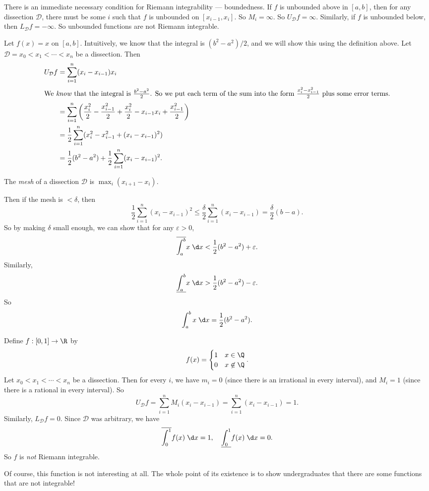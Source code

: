 \documentclass[a4paper]{article}
\begin{document}
There is an immediate necessary condition for Riemann integrability --- boundedness. If $f$ is unbounded above in $[a, b]$, then for any dissection $\mathcal{D}$, there must be some $i$ such that $f$ is unbounded on $[x_{i - 1}, x_i]$. So $M_i = \infty$. So $U_\mathcal{D} f = \infty$. Similarly, if $f$ is unbounded below, then $L_{\mathcal{D}} f = -\infty$. So unbounded functions are not Riemann integrable.

\begin{eg}
  Let $f(x) = x$ on $[a, b]$. Intuitively, we know that the integral is $(b^2 - a^2)/2$, and we will show this using the definition above. Let $\mathcal{D} = x_0 < x_1 < \cdots < x_n$ be a dissection. Then
  \begin{align*}
    U_{\mathcal{D}}f &= \sum_{i = 1}^n (x_i - x_{i - 1})x_i\\
    \intertext{We \emph{know} that the integral is $\frac{b^2 - a^2}{2}$. So we put each term of the sum into the form $\frac{x_i^2 - x_{i - 1}^2}{2}$ plus some error terms.}
    &= \sum_{i = 1}^n \left(\frac{x_i^2}{2} - \frac{x_{i - 1}^2}{2} + \frac{x_i^2}{2} - x_{i - 1}x_i + \frac{x_{i - 1}^2}{2}\right)\\
    &= \frac{1}{2}\sum_{i = 1}^n (x_i^2 - x_{i - 1}^2 + (x_i - x_{i - 1})^2)\\
    &= \frac{1}{2}(b^2 - a^2) + \frac{1}{2}\sum_{i = 1}^n(x_i - x_{i - 1})^2.
  \end{align*}
  \begin{defi}[Mesh]
    The \emph{mesh} of a dissection $\mathcal{D}$ is $\max_i (x_{i+1} - x_i)$.
  \end{defi}
  Then if the mesh is $ < \delta$, then
    \[
      \frac{1}{2}\sum_{i = 1}^n (x_i - x_{i - 1})^2 \leq \frac{\delta}{2}\sum_{i = 1}^n (x_i - x_{i - 1}) = \frac{\delta}{2}(b - a).
    \]
  So by making $\delta$ small enough, we can show that for any $\varepsilon > 0$,
  \[
    \overline{\int_a^b} x\;\d x < \frac{1}{2}(b^2 - a^2) + \varepsilon.
  \]
  Similarly,
  \[
    \underline{\int_a^b} x\;\d x > \frac{1}{2}(b^2 - a^2) - \varepsilon.
  \]
  So
  \[
    \int_a^b x\;\d x = \frac{1}{2}(b^2 - a^2).
  \]
\end{eg}

\begin{eg}
  Define $f: [0, 1] \to \R$ by
  \[
    f(x) =
    \begin{cases}
      1 & x \in \Q\\
      0 & x \not\in \Q
    \end{cases}.
  \]
  Let $x_0 < x_1 < \cdots < x_n$ be a dissection. Then for every $i$, we have $m_i = 0$ (since there is an irrational in every interval), and $M_i = 1$ (since there is a rational in every interval). So
  \[
    U_{\mathcal{D}}f = \sum_{i = 1}^nM_i(x_i - x_{i - 1}) = \sum_{i = 1}^n (x_i - x_{i - 1}) = 1.
  \]
  Similarly, $L_\mathcal{D} f = 0$. Since $\mathcal{D}$ was arbitrary, we have
  \[
    \overline{\int_0^1}f(x)\;\d x = 1, \quad \underline{\int_0^1}f(x)\;\d x = 0.
  \]
  So $f$ is \emph{not} Riemann integrable.

  Of course, this function is not interesting at all. The whole point of its existence is to show undergraduates that there are some functions that are not integrable!
\end{eg}
\end{document}
